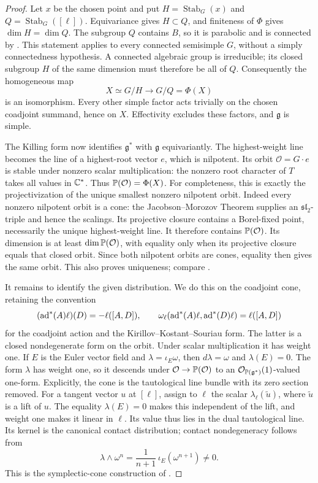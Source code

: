 \begin{proof}
Let $x$ be the chosen point and put
$H=\operatorname{Stab}_G(x)$ and
$Q=\operatorname{Stab}_G([\ell])$. Equivariance gives $H\subset Q$,
and finiteness of $\Phi$ gives $\dim H=\dim Q$. The subgroup $Q$
contains $B$, so it is parabolic and is connected by
\cite[Corollary~17.49]{Milne2022}. This statement applies to every
connected semisimple $G$, without a simply connectedness hypothesis.
A connected algebraic group is irreducible;
its closed subgroup $H$ of the same dimension must therefore be
all of $Q$. Consequently the homogeneous map
\[
 X\simeq G/H\longrightarrow G/Q=\Phi(X)
\]
is an isomorphism. Every other simple factor acts trivially on the
chosen coadjoint summand, hence on $X$. Effectivity excludes these
factors, and $\mathfrak g$ is simple.

The Killing form now identifies $\mathfrak g^*$ with $\mathfrak g$
equivariantly. The highest-weight line becomes the line of a
highest-root vector $e$, which is nilpotent. Its orbit
$\mathcal O=G\cdot e$ is stable under nonzero scalar multiplication:
the nonzero root character of $T$ takes all values in $\mathbb C^*$.
Thus $\mathbb P(\mathcal O)=\Phi(X)$. For completeness, this is exactly
the projectivization of the unique smallest nonzero nilpotent orbit.
Indeed every nonzero nilpotent orbit is a cone: the
Jacobson--Morozov Theorem supplies an $\mathfrak{sl}_2$-triple and hence
the scalings. Its projective
closure contains a Borel-fixed point, necessarily the unique
highest-weight line. It therefore contains $\mathbb P(\mathcal O)$.
Its dimension is at least $\dim\mathbb P(\mathcal O)$, with equality
only when its projective closure equals that closed orbit. Since
both nilpotent orbits are cones, equality then gives the same
orbit. This also proves uniqueness; compare
\cite[Section~2.4 and Proposition~2.6]{Beauville1998}.

It remains to identify the given distribution. We do this on the
coadjoint cone, retaining the convention
\[
 (\operatorname{ad}^*(A)\ell)(D)=-\ell([A,D]),\qquad
 \omega_\ell(\operatorname{ad}^*(A)\ell,\operatorname{ad}^*(D)\ell)=\ell([A,D])
\]
for the coadjoint action and the Kirillov--Kostant--Souriau form.
The latter is a closed nondegenerate form on the orbit. Under
scalar multiplication it has weight one. If $E$ is the Euler
vector field and $\lambda=\iota_E\omega$, then
$d\lambda=\omega$ and $\lambda(E)=0$. The form $\lambda$ has weight
one, so it descends under $\mathcal O\to\mathbb P(\mathcal O)$ to an
$\mathcal O_{\mathbb P(\mathfrak g^*)}(1)$-valued one-form. Explicitly, the cone is
the tautological line bundle with its zero section removed. For a tangent
vector $u$ at $[\ell]$, assign to $\ell$ the scalar
$\lambda_\ell(\widetilde u)$, where $\widetilde u$ is a lift of $u$.
The equality $\lambda(E)=0$ makes this independent of the lift,
and weight one makes it linear in $\ell$. Its value thus lies in
the dual tautological line. Its kernel is the canonical contact
distribution; contact nondegeneracy follows from
\[
 \lambda\wedge\omega^n
   =\frac{1}{n+1}\,\iota_E(\omega^{n+1})\ne0.
\]
This is the symplectic-cone construction of
\cite[Sections~2.1--2.2]{Beauville1998}.


\end{proof}
